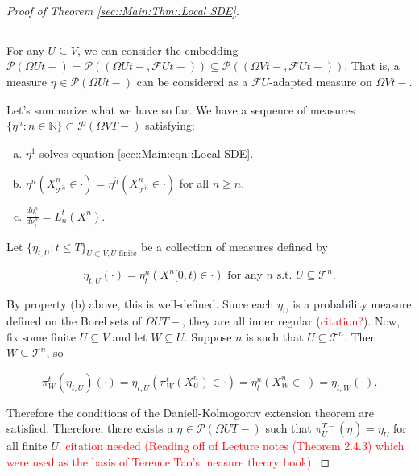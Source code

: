 \documentclass[12pt]{article}
\newcommand{\mb}{\mathbb}
\newcommand{\mc}{\mathcal}
\newcommand{\ms}{\mathscr}
\newcommand{\te}{\text}
\newcommand{\tr}{\textcolor{red}}
\newcommand{\ind}{\hspace{24pt}}
\newcommand{\lin}{\rule{\linewidth}{0.4 pt}}
\newcommand{\pmsr}{\mc{P}}							%
\renewcommand{\U}{U}							%
\newcommand{\UU}{W}								%
\newcommand{\T}{T}								%
\renewcommand{\t}{t}							%
\newcommand{\F}{\mc{F}}							%
\newcommand{\pup}[1]{^{#1}}							%
\newcommand{\tree}{\mc{T}}							%
\newcommand{\V}{V}									%
\newcommand{\numb}{n}								%
\newcommand{\piV}[2]{\pi_{#1}^{#2}}					%
\newcommand{\rxvtsn}[3]{X_{#1}^{#3}{#2}}			%
\newcommand{\mm}[3]{\nu_{#2#1}^{#3}}						%
\newcommand{\mmm}[3]{\eta_{#2#1}^{#3}}						%
\newcommand{\alt}{\widetilde}						%
\newcommand{\dense}[2]{L_{#1}^{#2}}				%
\begin{document}
\begin{proof}[Proof of Theorem \ref{sec::Main:Thm::Local SDE}]
\lin

For any \(\U\subseteq \V\), we can consider the embedding \(\pmsr\left(\Omega{\U}{\t-}\right) = \pmsr\left((\Omega{\U}{\t-},\F{\U}{\t-})\right) \subseteq \pmsr\left((\Omega{\V}{\t-},\F{\U}{\t-})\right)\). That is, a measure \(\mmm{}{}{}\in \pmsr\left(\Omega{\U}{\t-}\right)\) can be considered as a \(\F{\U}{}\)-adapted measure on \(\Omega{\V}{\t-}\).

\ind Let's summarize what we have so far. We have a sequence of measures \(\{\mmm{}{}{\numb}:\numb\in\mb{N}\} \subset \pmsr(\Omega{\V}{\T-})\) satisfying:

\begin{enumerate}[(a)]
\item \(\mmm{}{}{1}\) solves equation \eqref{sec::Main:eqn::Local SDE}.

\item \(\mmm{}{}{\numb}(\rxvtsn{\tree\pup{\alt{\numb}}}{}{\numb} \in \cdot) = \mmm{}{}{\alt{\numb}}(\rxvtsn{\tree\pup{\alt{\numb}}}{}{\alt{\numb}}\in \cdot)\) for all \(\numb \geq \alt{\numb}\).

\item \(\frac{d\mmm{}{\t}{\numb}}{d\mm{}{\t}{\numb}} = \dense{\numb}{\t}(\rxvtsn{}{}{\numb})\).
\end{enumerate}

Let \(\{\mmm{\U}{\t,}{}:\t \leq \T\}_{\U\subset \V,\U\te{ finite}}\) be a collection of measures defined by

\[\mmm{\U}{\t,}{}(\cdot) = \mmm{}{\t}{\numb}(\rxvtsn{}{[0,\t)}{\numb} \in \cdot) \te{ for any }\numb\te{ s.t. }\U \subseteq \tree\pup{\numb}.\]

By property (b) above, this is well-defined. Since each \(\mmm{\U}{}{}\) is a probability measure defined on the Borel sets of \(\Omega{\U}{\T-}\), they are all inner regular (\tr{citation?}). Now, fix some finite \(\U\subseteq \V\) and let \(\UU \subseteq \U\). Suppose \(\numb\) is such that \(\U \subseteq \tree\pup{\numb}\). Then \(\UU\subseteq \tree\pup{\numb}\), so

\[\piV{\UU}{\t}(\mmm{\U}{\t,}{})(\cdot) = \mmm{\U}{\t,}{}\left(\piV{\UU}{\t}(\rxvtsn{\U}{}{\numb}) \in \cdot\right) = \mmm{}{\t}{\numb}\left(\rxvtsn{\UU}{}{\numb} \in \cdot\right) = \mmm{\UU}{\t,}{}(\cdot).\]

Therefore the conditions of the Daniell-Kolmogorov extension theorem are satisfied. Therefore, there exists a \(\mmm{}{}{}\in \ms{P}(\Omega{\U}{\T-})\) such that \(\piV{\U}{\T-}(\mmm{}{}{}) =\mmm{\U}{}{}\) for all finite \(\U\). \tr{citation needed (Reading off of Lecture notes (Theorem 2.4.3) which were used as the basis of Terence Tao's measure theory book)}.


\end{proof}
\end{document}
